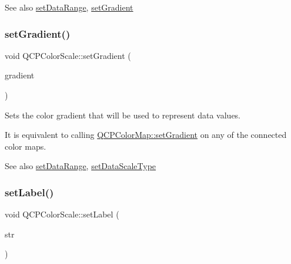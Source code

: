 \begin{DoxySeeAlso}{See also}
\mbox{\hyperlink{class_q_c_p_color_scale_abe88633003a26d1e756aa74984587fef}{set\+Data\+Range}}, \mbox{\hyperlink{class_q_c_p_color_scale_a1f29583bb6f1e7f473b62fb712be3940}{set\+Gradient}} 
\end{DoxySeeAlso}
\mbox{\label{class_q_c_p_color_scale_a1f29583bb6f1e7f473b62fb712be3940}} 
\subsubsection{\texorpdfstring{setGradient()}{setGradient()}}
{\footnotesize\ttfamily void Q\+C\+P\+Color\+Scale\+::set\+Gradient (\begin{DoxyParamCaption}\item[{const \mbox{\hyperlink{class_q_c_p_color_gradient}{Q\+C\+P\+Color\+Gradient}} \&}]{gradient }\end{DoxyParamCaption})}

Sets the color gradient that will be used to represent data values.

It is equivalent to calling \mbox{\hyperlink{class_q_c_p_color_map_a7313c78360471cead3576341a2c50377}{Q\+C\+P\+Color\+Map\+::set\+Gradient}} on any of the connected color maps.

\begin{DoxySeeAlso}{See also}
\mbox{\hyperlink{class_q_c_p_color_scale_abe88633003a26d1e756aa74984587fef}{set\+Data\+Range}}, \mbox{\hyperlink{class_q_c_p_color_scale_aeb6107d67dd7325145b2498abae67fc3}{set\+Data\+Scale\+Type}} 
\end{DoxySeeAlso}
\mbox{\label{class_q_c_p_color_scale_aee124ae8396320cacf8276e9a0fbb8ce}} 
\subsubsection{\texorpdfstring{setLabel()}{setLabel()}}
{\footnotesize\ttfamily void Q\+C\+P\+Color\+Scale\+::set\+Label (\begin{DoxyParamCaption}\item[{const Q\+String \&}]{str }\end{DoxyParamCaption})}

